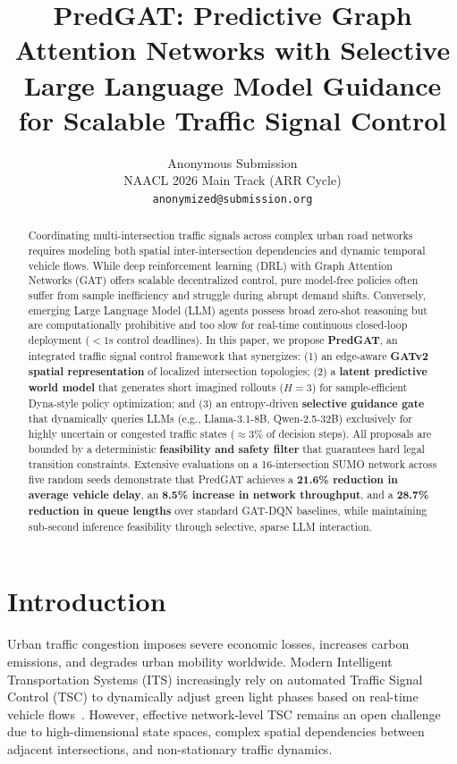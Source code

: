 \documentclass[11pt,a4paper,twocolumn]{article}
\title{PredGAT: Predictive Graph Attention Networks with Selective Large Language Model Guidance for Scalable Traffic Signal Control}
\author{
  Anonymous Submission \\
  NAACL 2026 Main Track (ARR Cycle) \\
  \texttt{anonymized@submission.org}
}
\date{}
\begin{document}
\maketitle

\begin{abstract}
Coordinating multi-intersection traffic signals across complex urban road networks requires modeling both spatial inter-intersection dependencies and dynamic temporal vehicle flows. While deep reinforcement learning (DRL) with Graph Attention Networks (GAT) offers scalable decentralized control, pure model-free policies often suffer from sample inefficiency and struggle during abrupt demand shifts. Conversely, emerging Large Language Model (LLM) agents possess broad zero-shot reasoning but are computationally prohibitive and too slow for real-time continuous closed-loop deployment ($<1$s control deadlines). In this paper, we propose \textbf{PredGAT}, an integrated traffic signal control framework that synergizes: (1) an edge-aware \textbf{GATv2 spatial representation} of localized intersection topologies; (2) a \textbf{latent predictive world model} that generates short imagined rollouts ($H=3$) for sample-efficient Dyna-style policy optimization; and (3) an entropy-driven \textbf{selective guidance gate} that dynamically queries LLMs (e.g., Llama-3.1-8B, Qwen-2.5-32B) exclusively for highly uncertain or congested traffic states ($\approx 3\%$ of decision steps). All proposals are bounded by a deterministic \textbf{feasibility and safety filter} that guarantees hard legal transition constraints. Extensive evaluations on a 16-intersection SUMO network across five random seeds demonstrate that PredGAT achieves a \textbf{21.6\% reduction in average vehicle delay}, an \textbf{8.5\% increase in network throughput}, and a \textbf{28.7\% reduction in queue lengths} over standard GAT-DQN baselines, while maintaining sub-second inference feasibility through selective, sparse LLM interaction.
\end{abstract}

\section{Introduction}
\label{sec:intro}
Urban traffic congestion imposes severe economic losses, increases carbon emissions, and degrades urban mobility worldwide. Modern Intelligent Transportation Systems (ITS) increasingly rely on automated Traffic Signal Control (TSC) to dynamically adjust green light phases based on real-time vehicle flows~\cite{wei2019presslight,chen2020toward}. However, effective network-level TSC remains an open challenge due to high-dimensional state spaces, complex spatial dependencies between adjacent intersections, and non-stationary traffic dynamics.
\end{document}
